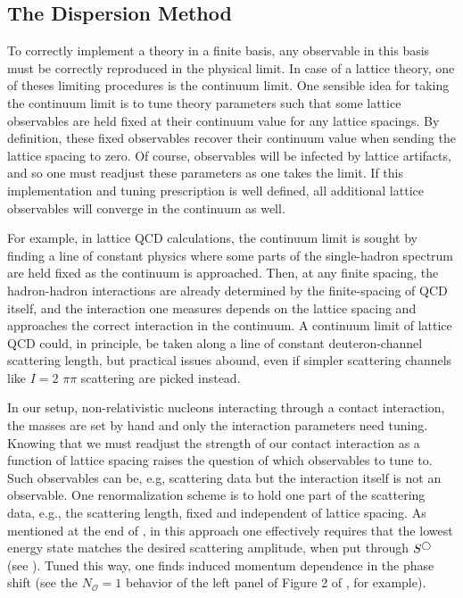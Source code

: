 \subsection{The Dispersion Method}\label{sec:dispersion}

To correctly implement a theory in a finite basis, any observable in this basis must be correctly reproduced in the physical limit.
In case of a lattice theory, one of theses limiting procedures is the continuum limit.
One sensible idea for taking the continuum limit is to tune theory parameters such that some lattice observables are held fixed at their continuum value for any lattice spacings.
By definition, these fixed observables recover their continuum value when sending the lattice spacing to zero.
Of course, observables will be infected by lattice artifacts, and so one must readjust these parameters as one takes the limit.
If this implementation and tuning prescription is well defined, all additional lattice observables will converge in the continuum as well.

For example, in lattice QCD calculations, the continuum limit is sought by finding a line of constant physics where some parts of the single-hadron spectrum are held fixed as the continuum is approached.
Then, at any finite spacing, the hadron-hadron interactions are already determined by the finite-spacing of QCD itself, and the interaction one measures depends on the lattice spacing and approaches the correct interaction in the continuum.
A continuum limit of lattice QCD could, in principle, be taken along a line of constant deuteron-channel scattering length, but practical issues abound, even if simpler scattering channels like $I=2$ $\pi\pi$ scattering are picked instead.

In our setup, non-relativistic nucleons interacting through a contact interaction, the masses are set by hand and only the interaction parameters need tuning.
Knowing that we must readjust the strength of our contact interaction as a function of lattice spacing raises the question of which observables to tune to.
Such observables can be, e.g, scattering data but the interaction itself is not an observable.
One renormalization scheme is to hold one part of the scattering data, e.g., the scattering length, fixed and independent of lattice spacing.
As mentioned at the end of , in this approach one effectively requires that the lowest energy state matches the desired scattering amplitude, when put through $S^{\bigcirc}$ (see ).
Tuned this way, one finds induced momentum dependence in the phase shift (see the $N_\mathcal{O}=1$ behavior of the left panel of Figure 2 of , for example).


